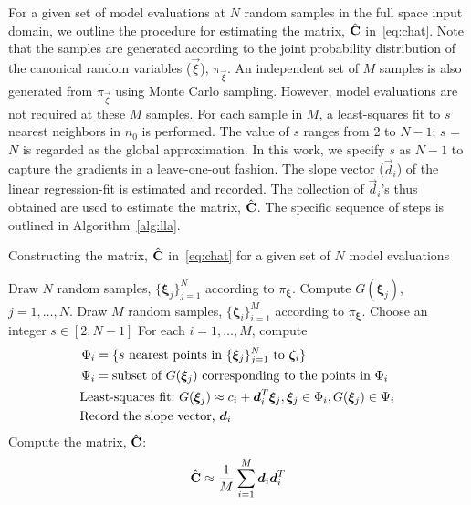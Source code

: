 For a given set of model evaluations at $N$ random samples in the full space input domain,
we outline the procedure for estimating the matrix, $\hat{\mathbf{{C}}}$ in~\eqref{eq:chat}.
Note that the samples are generated
according to the joint probability distribution of the canonical random variables
($\vec\xi$), $\pi_\vec\xi$. An independent set of $M$ samples is also generated from $\pi_\vec\xi$
using Monte Carlo sampling. However, model evaluations are not required at these $M$ samples.
For each sample in $M$, a least-squares fit to $s$ nearest neighbors in
$n_0$ is performed. The value of $s$ ranges from 2 to $N-1$; $s$ = $N$ is regarded as the global approximation.
In this work, we specify $s$ as $N-1$ to capture the gradients in a leave-one-out fashion.
The slope vector ($\vec{d}_i$) of the linear regression-fit is estimated and recorded.
The collection of $\vec{d}_i$'s thus obtained are used to estimate the matrix, $\hat{\mathbf{{C}}}$. The specific 
sequence of steps is outlined in Algorithm~\ref{alg:lla}.
%
\bigskip
\begin{breakablealgorithm}
\renewcommand{\algorithmicrequire}{\textbf{Input:}}
\renewcommand{\algorithmicensure}{\textbf{Output:}}
  \caption{Constructing the matrix, $\hat{\mathbf{{C}}}$ in~\eqref{eq:chat} for a given set of $N$ model evaluations}
  \begin{algorithmic}[1]
	\State Draw $N$ random samples, $\{\bm{\xi}_j\}_{j=1}^{N}$ 
	according to $\pi_{\bm{\xi}}$.
	\State Compute $G(\bm\xi_j)$, $j=1, \ldots, N$.
	\State Draw $M$ random samples, $\{\bm{\zeta}_i\}_{i=1}^{M}$
	according to $\pi_{\bm{\xi}}$.
	\State Choose an integer $s \in [2,N-1]$ 
	\State For each $i=1, \ldots, M$, compute 
	\[
	\begin{aligned}
	\Phi_i &= \{ s \text{ nearest points in } \{\bm{\xi}_j\}_{j=1}^{N} \text{ to } \bm{\zeta}_i\}\\
	\vspace{-2mm}
	\Psi_i &= \text{subset of } G(\bm\xi_j) \text{ corresponding to the points in } \Phi_i\\
	\vspace{-2mm}
	 &{\color{white}=} \hspace{-7mm} \text{Least-squares fit:~} 
	 G(\bm\xi_j) \approx c_i + \vec{d}_i^T\bm{\xi}_j,  \bm{\xi}_j \in \Phi_i, G(\bm\xi_j) \in \Psi_i\\
	 \vspace{-2mm}
	  &{\color{white}=} \hspace{-7mm}\text{Record the slope vector,}~\vec{d}_i
	\end{aligned}
	\]
	\State Compute the matrix, $\hat{\mathbf{{C}}}$:
	\[
	\hat{\mat{C}} \approx \frac{1}{M} \sum_{i=1}^{M} \vec{d}_i\vec{d}_i^T 
	\]
	\EndProcedure
  \end{algorithmic}
  \label{alg:lla}
\end{breakablealgorithm}
\bigskip
%


